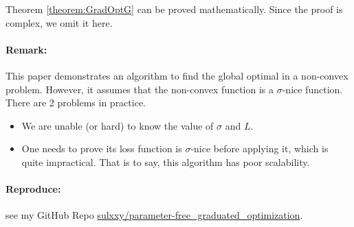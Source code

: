 Theorem \ref{theorem:GradOptG} can be proved mathematically. Since the proof is complex, we omit it here.

\paragraph{Remark: } This paper demonstrates an algorithm to find the global optimal in a non-convex problem. However, it assumes that the non-convex function is a $\sigma$-nice function. There are 2 problems in practice. 
\begin{itemize}
    \item We are unable (or hard) to know the value of $\sigma$ and $L$.
    \item One needs to prove its loss function is $\sigma$-nice before applying it, which is quite impractical. That is to say, this algorithm has poor scalability. 
\end{itemize}

\paragraph{Reproduce: } see my GitHub Repo \href{https://github.com/sulxxy/parameter-free_graduated_optimization/tree/master/reproductions/graduated_opt_for_non-convex}{sulxxy/parameter-free\_graduated\_optimization}.